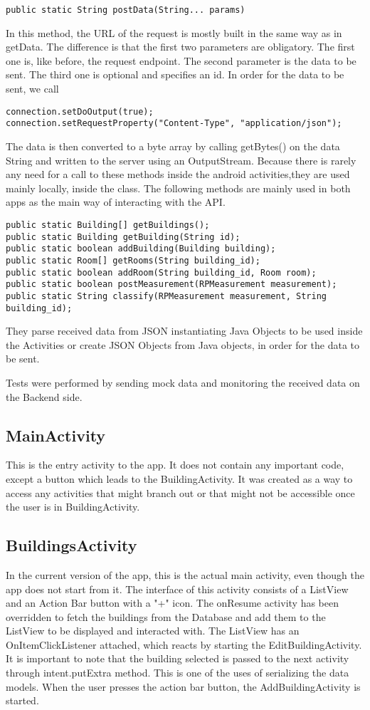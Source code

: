 \begin{lstlisting}
public static String postData(String... params)
\end{lstlisting}
In this method, the URL of the request is mostly built in the same way as in getData. The difference is that the first two parameters are obligatory. The first one is, like before, the request endpoint. The second parameter is the data to be sent. The third one is optional and specifies an id. 
In order for the data to be sent, we call
\begin{lstlisting}
connection.setDoOutput(true);
connection.setRequestProperty("Content-Type", "application/json");
\end{lstlisting}
The data is then converted to a byte array by calling getBytes() on the data String and written to the server using an OutputStream.
Because there is rarely any need for a call to these methods inside the android activities,they are used mainly locally, inside the class. The following methods are mainly used in both apps as the main way of interacting with the API.
\begin{lstlisting}
public static Building[] getBuildings();
public static Building getBuilding(String id);
public static boolean addBuilding(Building building);
public static Room[] getRooms(String building_id);
public static boolean addRoom(String building_id, Room room);
public static boolean postMeasurement(RPMeasurement measurement);
public static String classify(RPMeasurement measurement, String building_id);
\end{lstlisting}
They parse received data from JSON instantiating Java Objects to be used inside the Activities or create JSON Objects from Java objects, in order for the data to be sent.

Tests were performed by sending mock data and monitoring the received data on the Backend side.
\subsection{MainActivity}
This is the entry activity to the app. It does not contain any important code, except a button which leads to the BuildingActivity. It was created as a way to access any activities that might branch out or that might not be accessible once the user is in BuildingActivity.

\subsection{BuildingsActivity}
In the current version of the app, this is the actual main activity, even though the app does not start from it.
The interface of this activity consists of a ListView and an Action Bar button with a "+" icon. 
The onResume activity has been overridden to fetch the buildings from the Database and add them to the ListView to be displayed and interacted with. The ListView has an OnItemClickListener attached, which reacts by starting the EditBuildingActivity. It is important to note that the building selected is passed to the next activity through intent.putExtra method. This is one of the uses of serializing the data models. When the user presses the action bar button, the AddBuildingActivity is started.

